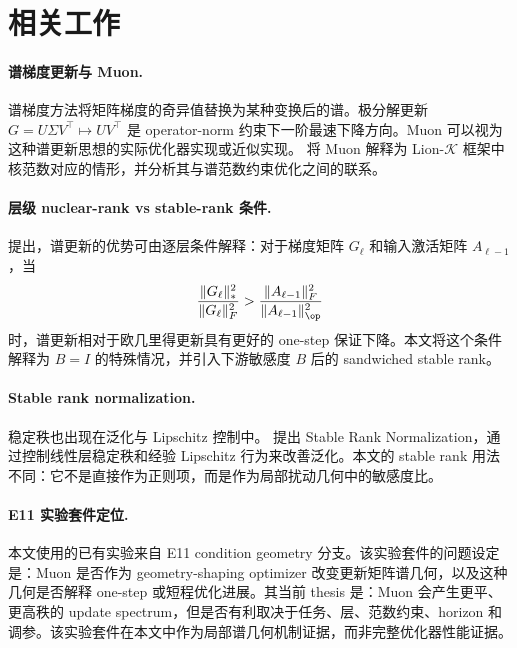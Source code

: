 \section{相关工作}

\paragraph{谱梯度更新与 Muon.}
谱梯度方法将矩阵梯度的奇异值替换为某种变换后的谱。极分解更新 \(G=U\Sigma V^\top\mapsto UV^\top\) 是 operator-norm 约束下一阶最速下降方向。Muon 可以视为这种谱更新思想的实际优化器实现或近似实现。\citet{chen2025muon} 将 Muon 解释为 Lion-\(\mathcal K\) 框架中核范数对应的情形，并分析其与谱范数约束优化之间的联系。

\paragraph{层级 nuclear-rank vs stable-rank 条件.}
\citet{davis2026spectral} 提出，谱更新的优势可由逐层条件解释：对于梯度矩阵 \(G_\ell\) 和输入激活矩阵 \(A_{\ell-1}\)，当
\[
\frac{\|G_\ell\|_*^2}{\|G_\ell\|_F^2}
>
\frac{\|A_{\ell-1}\|_F^2}{\|A_{\ell-1}\|_{\op}^2}
\]
时，谱更新相对于欧几里得更新具有更好的 one-step 保证下降。本文将这个条件解释为 \(B=I\) 的特殊情况，并引入下游敏感度 \(B\) 后的 sandwiched stable rank。

\paragraph{Stable rank normalization.}
稳定秩也出现在泛化与 Lipschitz 控制中。\citet{sanyal2020stable} 提出 Stable Rank Normalization，通过控制线性层稳定秩和经验 Lipschitz 行为来改善泛化。本文的 stable rank 用法不同：它不是直接作为正则项，而是作为局部扰动几何中的敏感度比。

\paragraph{E11 实验套件定位.}
本文使用的已有实验来自 E11 condition geometry 分支。该实验套件的问题设定是：Muon 是否作为 geometry-shaping optimizer 改变更新矩阵谱几何，以及这种几何是否解释 one-step 或短程优化进展。其当前 thesis 是：Muon 会产生更平、更高秩的 update spectrum，但是否有利取决于任务、层、范数约束、horizon 和调参。该实验套件在本文中作为局部谱几何机制证据，而非完整优化器性能证据。
